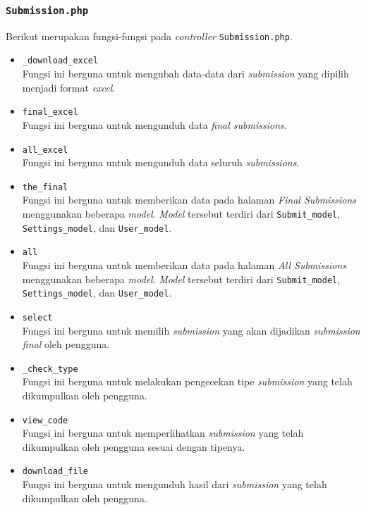 \subsubsection{\texttt{Submission.php}}
Berikut merupakan fungsi-fungsi pada \textit{controller} \texttt{Submission.php}.
\begin{itemize}
	\item \texttt{\_download\_excel}\\
	Fungsi ini berguna untuk mengubah data-data dari \textit{submission} yang dipilih menjadi format \textit{excel}.
	\item \texttt{final\_excel}\\
	Fungsi ini berguna untuk mengunduh data \textit{final submissions}.
	\item \texttt{all\_excel}\\
	Fungsi ini berguna untuk mengunduh data seluruh \textit{submissions}.
	\item \texttt{the\_final}\\
	Fungsi ini berguna untuk memberikan data pada halaman \textit{Final Submissions} menggunakan beberapa \textit{model}. \textit{Model} tersebut terdiri dari \texttt{Submit\_model}, \texttt{Settings\_model}, dan \texttt{User\_model}.
	\item \texttt{all}\\
	Fungsi ini berguna untuk memberikan data pada halaman \textit{All Submissions} menggunakan beberapa \textit{model}. \textit{Model} tersebut terdiri dari \texttt{Submit\_model}, \texttt{Settings\_model}, dan \texttt{User\_model}.
	\item \texttt{select}\\
	Fungsi ini berguna untuk memilih \textit{submission} yang akan dijadikan \textit{submission final} oleh pengguna.
	\item \texttt{\_check\_type}\\
	Fungsi ini berguna untuk melakukan pengecekan tipe \textit{submission} yang telah dikumpulkan oleh pengguna.
	\item \texttt{view\_code}\\
	Fungsi ini berguna untuk memperlihatkan \textit{submission} yang telah dikumpulkan oleh pengguna sesuai dengan tipenya.
	\item \texttt{download\_file}\\
	Fungsi ini berguna untuk mengunduh hasil dari \textit{submission} yang telah dikumpulkan oleh pengguna.
\end{itemize}
